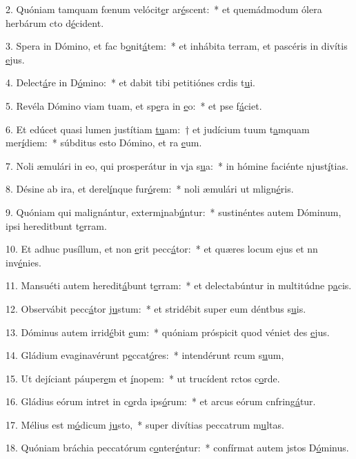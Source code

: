2. Quóniam tamquam fœnum velócit\uline{e}r ar\uline{é}scent:~* et quemádmodum ólera herbárum cto d\uline{é}cident.\par 
3. Spera in Dómino, et fac b\uline{o}nit\uline{á}tem:~* et inhábita terram, et pascéris in divítis \uline{e}jus.\par 
4. Delect\uline{á}re in D\uline{ó}mino:~* et dabit tibi petitiónes crdis t\uline{u}i.\par 
5. Revéla Dómino viam tuam, et sp\uline{e}ra in \uline{e}o:~* et pse f\uline{á}ciet.\par 
6. Et edúcet quasi lumen justítiam \uline{tu}am:~† et judícium tuum t\uline{a}mquam mer\uline{í}diem:~* súbditus esto Dómino, et ra \uline{e}um.\par 
7. Noli æmulári in eo, qui prosperátur in v\uline{i}a s\uline{u}a:~* in hómine faciénte njust\uline{í}tias.\par 
8. Désine ab ira, et derel\uline{í}nque fur\uline{ó}rem:~* noli æmulári ut mlign\uline{é}ris.\par 
9. Quóniam qui malignántur, exterm\uline{i}nab\uline{ú}ntur:~* sustinéntes autem Dóminum, ipsi hereditbunt t\uline{e}rram.\par 
10. Et adhuc pusíllum, et non \uline{e}rit pecc\uline{á}tor:~* et quæres locum ejus et nn inv\uline{é}nies.\par 
11. Mansuéti autem heredit\uline{á}bunt t\uline{e}rram:~* et delectabúntur in multitúdne p\uline{a}cis.\par 
12. Observábit pecc\uline{á}tor j\uline{u}stum:~* et stridébit super eum déntbus s\uline{u}is.\par 
13. Dóminus autem irrid\uline{é}bit \uline{e}um:~* quóniam próspicit quod véniet des \uline{e}jus.\par 
14. Gládium evaginavérunt p\uline{e}ccat\uline{ó}res:~* intendérunt rcum s\uline{u}um,\par 
15. Ut dejíciant páuper\uline{e}m et \uline{í}nopem:~* ut trucídent rctos c\uline{o}rde.\par 
16. Gládius eórum intret in c\uline{o}rda ips\uline{ó}rum:~* et arcus eórum cnfring\uline{á}tur.\par 
17. Mélius est m\uline{ó}dicum j\uline{u}sto,~* super divítias peccatrum m\uline{u}ltas.\par 
18. Quóniam bráchia peccatórum c\uline{o}nter\uline{é}ntur:~* confírmat autem jstos D\uline{ó}minus.\par 
